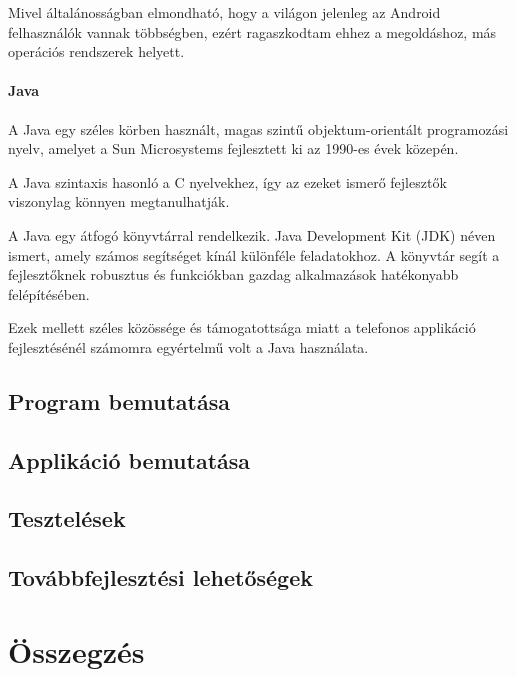 \documentclass[
]{thesis-ekf}
\theoremstyle{definition}
\theoremstyle{remark}
\begin{document}
Mivel általánosságban elmondható, hogy a világon jelenleg az Android felhasználók vannak többségben, ezért ragaszkodtam ehhez a megoldáshoz, más operációs rendszerek helyett.

\subsubsection{Java}
A Java egy széles körben használt, magas szintű objektum-orientált programozási nyelv, amelyet a Sun Microsystems fejlesztett ki az 1990-es évek közepén. 

A Java szintaxis hasonló a C nyelvekhez, így az ezeket ismerő fejlesztők viszonylag könnyen megtanulhatják. 

A Java egy átfogó könyvtárral rendelkezik. Java Development Kit (JDK) néven ismert, amely számos segítséget kínál különféle feladatokhoz. A könyvtár segít a fejlesztőknek robusztus és funkciókban gazdag alkalmazások hatékonyabb felépítésében.

Ezek mellett széles közössége és támogatottsága miatt a telefonos applikáció fejlesztésénél számomra egyértelmű volt a Java használata.

\section{Program bemutatása}

\section{Applikáció bemutatása}

\section{Tesztelések}

\section{Továbbfejlesztési lehetőségek}

\chapter*{Összegzés}


\begin{thebibliography}{2}
\end{thebibliography}


\end{document}
